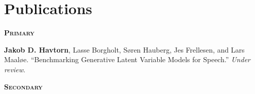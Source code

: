 \chapter{Publications}

\noindent\textbf{\textsc{Primary}}

\begin{enumerate}[leftmargin=18mm,topsep=0mm,label={[\Alph*]}]

    \item {}

    \item \textbf{Jakob D. Havtorn}, Lasse Borgholt, Søren Hauberg, Jes Frellesen, and Lars Maaløe. “Benchmarking Generative Latent Variable Models for Speech.” \textit{Under review}.

\end{enumerate}

\noindent\textsc{\textbf{Secondary}}

